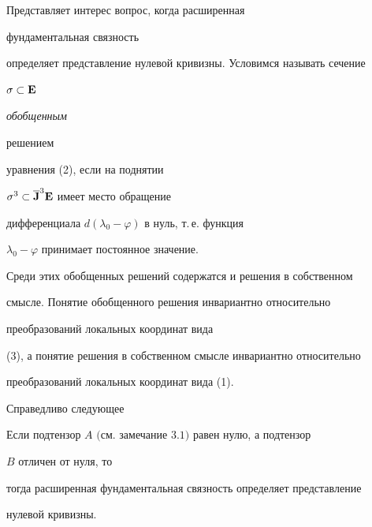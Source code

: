 \begin{notes} Представляет интерес вопрос, когда расширенная 


фундаментальная связность 


определяет представление нулевой кривизны. Условимся называть сечение 


$\sigma\subset\bold E$ {\it обобщенным 


решением} уравнения (2), если на поднятии 


$\sigma^3\subset\overline{\bold J}^3\bold E$ имеет место обращение  


дифференциала $d(\lambda_0-\varphi)$ в нуль, т.\,е. функция 


$\lambda_0-\varphi$ принимает постоянное значение.  


Среди этих обобщенных решений содержатся и решения в собственном 


смысле. Понятие обобщенного решения инвариантно относительно 


преобразований локальных координат вида 


(3), а понятие решения в собственном смысле инвариантно относительно  


преобразований локальных координат вида (1). 


\end{notes} 


 


Справедливо следующее 


 


\begin{assrtnonum} 


Если подтензор $A$ $($см. замечание $3.1)$ равен нулю, а подтензор 


$B$ отличен от нуля, то 


тогда расширенная фундаментальная связность определяет представление  


нулевой кривизны. 


\end{assrtnonum} 


 


